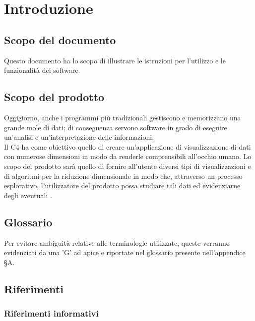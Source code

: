 \section{Introduzione}
\subsection{Scopo del documento}
Questo documento ha lo scopo di illustrare le istruzioni per l'utilizzo e le funzionalità del software.

\subsection{Scopo del prodotto}
Oggigiorno, anche i programmi più tradizionali gestiscono e memorizzano una grande mole di dati; di conseguenza servono software in grado di eseguire un'analisi e un'interpretazione delle informazioni.\\
Il  C4 ha come obiettivo quello di creare un'applicazione di visualizzazione di dati con numerose dimensioni in modo da renderle comprensibili all'occhio umano.  Lo scopo del prodotto sarà quello di fornire all'utente diversi tipi di visualizzazioni e di algoritmi per la riduzione dimensionale in modo che, attraverso un processo esplorativo, l'utilizzatore del prodotto possa studiare tali dati ed evidenziarne degli eventuali . 

\subsection{Glossario}
Per evitare ambiguità relative alle terminologie utilizzate, queste verranno evidenziati da una 'G' ad apice e riportate nel glossario presente nell'appendice \S A.

\subsection{Riferimenti}

\subsubsection{Riferimenti informativi}
\label{riferimenti}

